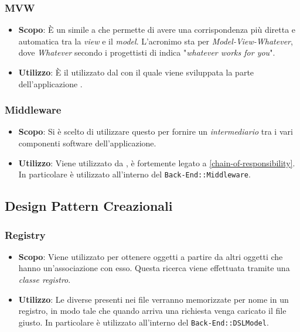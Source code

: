\subsubsection{MVW}

\begin{itemize}

	\item \textbf{Scopo}: È un  simile a  che permette di avere una corrispondenza più diretta e automatica tra la \textit{view} e il \textit{model}. L'acronimo  sta per \textit{Model-View-Whatever}, dove \textit{Whatever} secondo i progettisti di  indica "\textit{whatever works for you}".
	\item \textbf{Utilizzo}: È il  utilizzato dal   con il quale viene sviluppata la parte  dell'applicazione .

\end{itemize}

\subsubsection{Middleware} 

\begin{itemize}

	\item \textbf{Scopo}: Si è scelto di utilizzare questo  per fornire un \textit{intermediario} tra i vari componenti software dell'applicazione.
	\item \textbf{Utilizzo}: Viene utilizzato da , è fortemente legato a \ref{chain-of-responsibility}. In particolare è utilizzato all'interno del  \texttt{Back-End::Middleware}.

\end{itemize}

\subsection{Design Pattern Creazionali}

\subsubsection{Registry}

\begin{itemize}

	\item \textbf{Scopo}: Viene utilizzato per ottenere oggetti a partire da altri oggetti che hanno un'associazione con esso. Questa ricerca viene effettuata tramite una \textit{classe registro}.
	\item \textbf{Utilizzo}: Le diverse  presenti nei file  verranno memorizzate per nome in un registro, in modo tale che quando arriva una richiesta venga caricato il file  giusto. In particolare è utilizzato all'interno del  \texttt{Back-End::DSLModel}.

\end{itemize}

